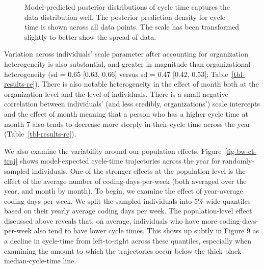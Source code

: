 \documentclass[
  sn-mathphys-ay,
]{sn-jnl}
\begin{document}
\begin{figure}


\caption[Model-predicted posterior distributions of cycle time captures
the data distribution well]{\label{fig-pp-check-sum}Model-predicted
posterior distributions of cycle time captures the data distribution
well. The posterior prediction density for cycle time is shown across
all data points. The scale has been transformed slightly to better show
the spread of data.}

\end{figure}%

Variation across individuals' scale parameter after accounting for
organization heterogeneity is also substantial, and greater in magnitude
than organizational heterogeneity (sd = 0.65 {[}0.63, 0.66{]} versus sd
= 0.47 {[}0.42, 0.53{]}; Table~\ref{tbl-results-re}). There is also
notable heterogeneity in the effect of month both at the organization
level and the level of individuals. There is a small negative
correlation between individuals' (and less credibly, organizations')
scale intercepts and the effect of month meaning that a person who has a
higher cycle time at month 7 also tends to decrease more steeply in
their cycle time across the year (Table~\ref{tbl-results-re}).

We also examine the variability around our population effects.
Figure~\ref{fig-bw-ct-traj} shows model-expected cycle-time trajectories
across the year for randomly-sampled individuals. One of the stronger
effects at the population-level is the effect of the average number of
coding-days-per-week (both averaged over the year, and month by month).
To begin, we examine the effect of year-average coding-days-per-week. We
split the sampled individuals into 5\%-wide quantiles based on their
yearly average coding days per week. The population-level effect
discussed above reveals that, on average, individuals who have more
coding-days-per-week also tend to have lower cycle times. This shows up
subtly in Figure 9 as a decline in cycle-time from left-to-right across
these quantiles, especially when examining the amount to which the
trajectories occur below the thick black median-cycle-time line.
\end{document}
